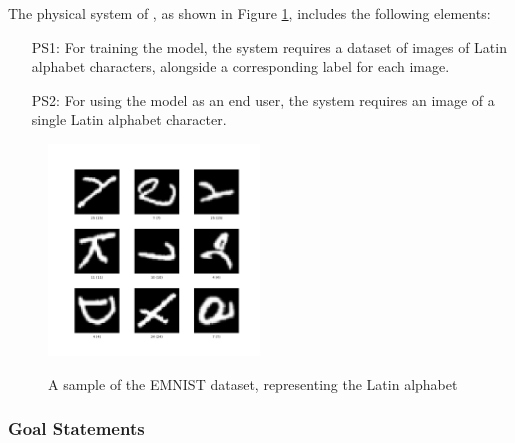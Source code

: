 \documentclass[12pt]{article}
\begin{document}

The physical system of \progname{}, as shown in Figure \ref{Fig_PhysicalSystem},
includes the following elements:

\begin{itemize}

\item[PS1:] For training the model, the system requires a dataset of images of
Latin alphabet characters, alongside a corresponding label for each image.
\item[PS2:] For using the model as an end user, the system requires an image
of a single Latin alphabet character.

\end{itemize}


\begin{figure}[h!]
\begin{center}
{
  \includegraphics[width=0.5\textwidth]{emnist-letters-3.1.0.png}
}
\caption{\label{Fig_PhysicalSystem} A sample of the EMNIST dataset,
representing the Latin alphabet}
\end{center}
\end{figure}

\subsubsection{Goal Statements}

\end{document}
